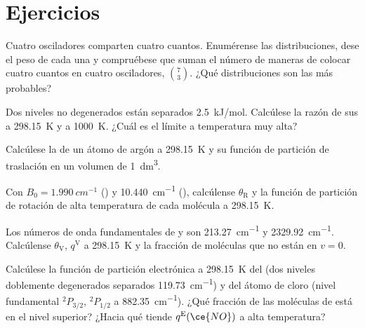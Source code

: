\section{Ejercicios}

\begin{exercise}[$\star$]\label{exo:b3:partition-functions:1}
Cuatro osciladores comparten cuatro cuantos. Enumérense las distribuciones, dese el peso de
cada una y compruébese que suman el número de maneras de colocar cuatro
cuantos  en cuatro osciladores, $\binom{7}{3}$. ¿Qué distribuciones son las
más probables?
\end{exercise}

\begin{exercise}[$\star$]\label{exo:b3:partition-functions:2}
Dos niveles no degenerados están separados \qty{2.5}{kJ/mol}. Calcúlese la razón de sus
 a \qty{298.15}{K} y a \qty{1000}{K}. ¿Cuál es el límite a temperatura muy
alta?
\end{exercise}

\begin{exercise}[$\star$]\label{exo:b3:partition-functions:3}
Calcúlese la  de un átomo de argón a \qty{298.15}{K} y su
función de partición de traslación en un volumen de \qty{1}{dm^3}.
\end{exercise}

\begin{exercise}[$\star$]\label{exo:b3:partition-functions:4}
Con $B_0 = \qty{1.990}{cm^{-1}}$ () y \qty{10.440}{cm^{-1}} (), calcúlense $\theta_{\mathrm R}$ y la
función de partición de rotación de alta temperatura de cada molécula a
\qty{298.15}{K}.
\end{exercise}

\begin{exercise}[$\star\star$]\label{exo:b3:partition-functions:5}
Los números de onda fundamentales de  y  son \qty{213.27}{cm^{-1}} y
\qty{2329.92}{cm^{-1}}. Calcúlense $\theta_{\mathrm V}$, $q^{\mathrm V}$ a \qty{298.15}{K} y la fracción de moléculas
que no están en $v = 0$.
\end{exercise}

\begin{exercise}[$\star\star$]\label{exo:b3:partition-functions:6}
Calcúlese la función de partición electrónica a \qty{298.15}{K} del  (dos niveles doblemente
degenerados separados \qty{119.73}{cm^{-1}}) y del átomo de cloro (nivel fundamental ${}^2P_{3/2}$,
${}^2P_{1/2}$ a \qty{882.35}{cm^{-1}}). ¿Qué fracción de las moléculas de  está en
el nivel superior? ¿Hacia qué tiende $q^{\mathrm E}(\ce{NO})$ a alta temperatura?
\end{exercise}

